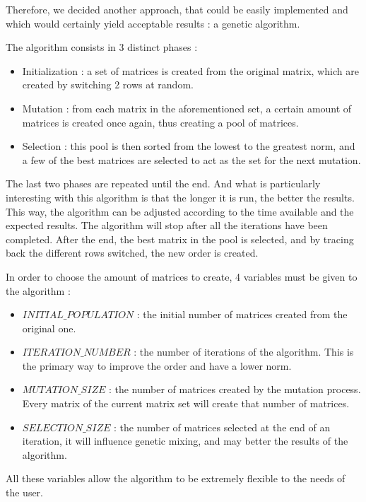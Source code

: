 \documentclass[12pt]{report}
\begin{document}
Therefore, we decided another approach, that could be easily implemented and which would certainly yield acceptable results : a genetic algorithm. 

The algorithm consists in 3 distinct phases :

\begin{itemize}
  \item Initialization : a set of matrices is created from the original matrix, which are created by switching 2 rows at random.
  \item Mutation : from each matrix in the aforementioned set, a certain amount of matrices is created once again, thus creating a pool of matrices.
  \item Selection : this pool is then sorted from the lowest to the greatest norm, and a few of the best matrices are selected to act as the set for the next mutation.
\end{itemize}

The last two phases are repeated until the end. And what is particularly interesting with this algorithm is that the longer it is run, the better the results. This way, the algorithm can be adjusted according to the time available and the expected results. The algorithm will stop after all the iterations have been completed.
After the end, the best matrix in the pool is selected, and by tracing back the different rows switched, the new order is created.

In order to choose the amount of matrices to create, 4 variables must be given to the algorithm :

\begin{itemize}
  \item $INITIAL\_POPULATION$ : the initial number of matrices created from the original one.
  \item $ITERATION\_NUMBER$ : the number of iterations of the algorithm. This is the primary way to improve the order and have a lower norm.
  \item $MUTATION\_SIZE$ : the number of matrices created by the mutation process. Every matrix of the current matrix set will create that number of matrices.
  \item $SELECTION\_SIZE$ : the number of matrices selected at the end of an iteration, it will influence genetic mixing, and may better the results of the algorithm.
\end{itemize}

All these variables allow the algorithm to be extremely flexible to the needs of the user. 
\end{document}
